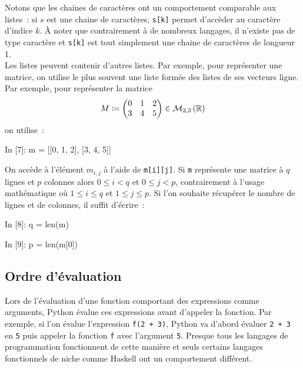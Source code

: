 \documentclass{magnoliaold}
\begin{document}
Notons 
que les chaines de caractères ont un comportement comparable aux listes~: si $s$ est une chaine de
caractères, \verb!s[k]! permet d'accèder au caractère d'indice $k$. À noter que contrairement à de nombreux
langages, il n'existe pas de type \og caractère \fg et \verb!s[k]! est tout simplement une chaine de
caractères de longueur 1.\\



Les listes peuvent contenir d'autres listes.
Par exemple, pour représenter une matrice, on utilise le plus souvent une liste
formée des listes de ses vecteurs ligne. Par exemple, pour représenter
la matrice
\[M\coloneqq\begin{pmatrix}
  0 & 1 & 2\\
  3 & 4 & 5
\end{pmatrix}\in\mathcal{M}_{2,3}\left(\mathbb{R}\right)\]
on utilise~:
\begin{pythoncode}
In [7]: m = [[0, 1, 2], [3, 4, 5]]
\end{pythoncode}
On accède à l'élément $m_{i,j}$ à l'aide de
\verb!m[i][j]!. Si \verb!m! représente une matrice à $q$ lignes et
$p$ colonnes alors $0\leq i<q$ et $0\leq j <p$, contrairement à l'usage
mathématique où $1\leq i\leq q$ et $1\leq j\leq p$. Si l'on souhaite
récupérer le nombre de lignes et de colonnes, il suffit d'écrire~:
\begin{pythoncode}
In [8]: q = len(m)

In [9]: p = len(m[0])
\end{pythoncode}


\subsection{Ordre d'évaluation}

Lors de l'évaluation d'une fonction comportant des expressions comme arguments, Python évalue ces
expressions avant d'appeler la fonction. Par exemple, si l'on évalue
l'expression \verb_f(2 + 3)_, Python va d'abord évaluer \verb_2 + 3_ en \verb_5_
puis appeler la fonction \verb_f_ avec l'argument \verb_5_. Presque tous les langages
de programmation fonctionnent de cette manière et seuls certains langages fonctionnels
de niche comme Haskell ont un comportement différent. \\
\end{document}
